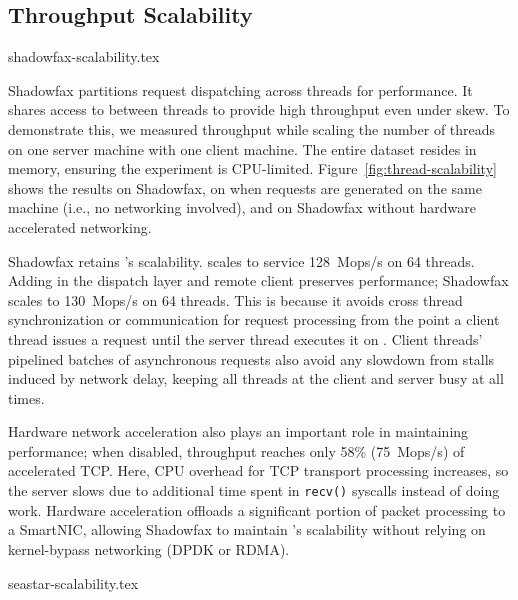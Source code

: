 \subsection{Throughput Scalability}
\label{sec:eval:clients}

 {shadowfax-scalability.tex}

Shadowfax partitions request dispatching across threads for
performance.
%
It shares access to \faster between threads to provide high
throughput even under skew.
%
To demonstrate this, we measured throughput while scaling the number of threads
on one server machine with one client machine.
%
The entire dataset resides in memory, ensuring the experiment is CPU-limited.
%
Figure~\ref{fig:thread-scalability} shows the results on Shadowfax, on
\faster when requests are generated on the same machine (i.e., no networking involved), and on Shadowfax without
hardware accelerated networking.

%
Shadowfax retains \faster{}'s scalability.
%
\faster{} scales to service 128~Mops/s on 64 threads.
%
Adding in the dispatch layer and remote client preserves performance;
Shadowfax scales to 130~Mops/s on 64 threads.
%
This is because it avoids cross thread synchronization or communication for
request processing from the point a client thread issues a request until the
server thread executes it on \faster.
%
Client threads' pipelined batches of asynchronous requests also avoid any
slowdown from stalls induced by network delay, keeping all threads at the
client and server busy at all times.

Hardware network acceleration also plays an important role in
maintaining performance; when disabled, throughput reaches only 58\%
(75~Mops/s) of
accelerated TCP.
%
Here, CPU overhead for TCP transport processing increases, so the server
slows due to additional time spent in \texttt{recv()} syscalls instead of doing
work.
%
Hardware acceleration offloads a significant portion of packet processing to a
SmartNIC, allowing Shadowfax to maintain \faster{}'s scalability without
relying on kernel-bypass networking (DPDK or RDMA).

 {seastar-scalability.tex}

